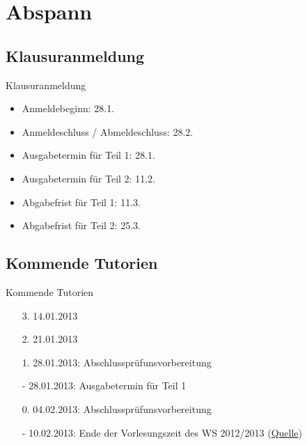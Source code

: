 \documentclass[usepdftitle=false,hyperref={pdfpagelabels=false}]{beamer}
\begin{document}
\section{Abspann}
\subsection{Klausuranmeldung}
\begin{frame}{Klausuranmeldung}
    \begin{itemize}
        \item Anmeldebeginn: 28.1.
        \item Anmeldeschluss / Abmeldeschluss: 28.2.
        \item Ausgabetermin für Teil 1: 28.1.
        \item Ausgabetermin für Teil 2: 11.2.
        \item Abgabefrist für Teil 1: 11.3.
        \item Abgabefrist für Teil 2: 25.3.
    \end{itemize}
\end{frame}

\subsection{Kommende Tutorien}
\begin{frame}{Kommende Tutorien}
  \begin{itemize}
    \item[3.] 14.01.2013
    \item[2.] 21.01.2013
    \item[1.] 28.01.2013: Abschlussprüfunsvorbereitung
    \item[-] 28.01.2013: Ausgabetermin für Teil 1
    \item[0.] 04.02.2013: Abschlussprüfunsvorbereitung
    \item[-] 10.02.2013: Ende der Vorlesungszeit des WS 2012/2013 (\href{http://www.kit.edu/studieren/2873.php}{Quelle})
  \end{itemize}
\end{frame}

\end{document}
